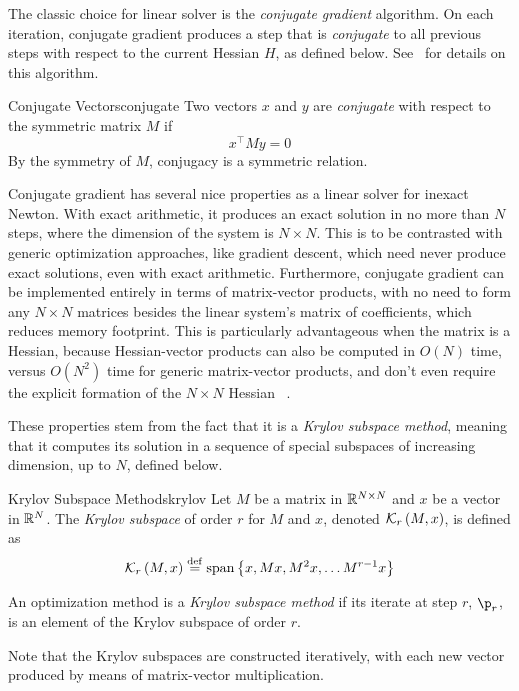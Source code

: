 \documentclass[../../thesis.tex]{subfiles}
\begin{document}
The classic choice for linear solver is the
\emph{conjugate gradient} algorithm.
On each iteration, conjugate gradient
produces a step that is \emph{conjugate}
to all previous steps
with respect to the current Hessian $H$,
as defined below.
See~\cite{boyd2004} for details on this algorithm.
\begin{definition}{Conjugate Vectors}{conjugate}
	Two vectors $x$ and $y$ are \emph{conjugate}
	with respect to the symmetric matrix $M$ if
	\begin{equation}
		x^\top M y = 0
	\end{equation}
	\noindent By the symmetry of $M$,
	conjugacy is a symmetric relation.
\end{definition}
\noindent

Conjugate gradient has several nice properties
as a linear solver for inexact Newton.
With exact arithmetic, it produces an exact solution
in no more than $N$ steps,
where the dimension of the system is $N\times N$.
This is to be contrasted with generic optimization approaches,
like gradient descent,
which need never produce exact solutions,
even with exact arithmetic.
Furthermore, conjugate gradient can be implemented entirely
in terms of matrix-vector products,
with no need to form any $N\times N$ matrices
besides the linear system's matrix of coefficients,
which reduces memory footprint.
This is particularly advantageous when the matrix is a Hessian,
because Hessian-vector products can also be computed in $O(N)$ time,
versus $O(N^2)$ time for generic matrix-vector products,
and don't even require the explicit formation of the $N \times N$ Hessian%
~\cite{pearlmutter1994}.

These properties stem from the fact that it is a
\emph{Krylov subspace method},
meaning that it computes
its solution in a sequence of special subspaces
of increasing dimension, up to $N$,
defined below.
\begin{definition}{Krylov Subspace Methods}{krylov}
	Let $M$ be a matrix in $\mathbb{R}^{N\times N}$
	and $x$ be a vector in $\mathbb{R}^N$.
	The \emph{Krylov subspace}
	of order $r$
	for $M$ and $x$, denoted
	${\mathcal{K}}_r\left(M, x\right)$,
	is defined as
	\begin{equation}
		{\mathcal{K}}_r\left(M, x\right)
		\stackrel{\small \mathrm{def}}{=} \mathrm{span}\left\{x, Mx, M^2x, \dots M^{r-1}x\right\}
	\end{equation}

	An optimization method is a
	\emph{Krylov subspace method}
	if its iterate at step $r$, $\p_r$,
	is an element of the Krylov subspace of order $r$.
\end{definition}
\noindent Note that the Krylov subspaces
are constructed iteratively,
with each new vector produced by
means of matrix-vector multiplication.
\end{document}
